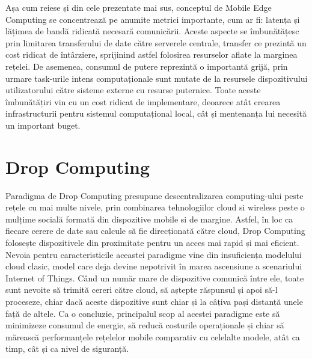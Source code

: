 \documentclass[12pt,a4paper]{report}
\begin{document}
Așa cum reiese și din cele prezentate mai sus, conceptul de Mobile Edge Computing se concentrează pe anumite metrici importante, cum ar fi: latența și lățimea de bandă ridicată necesară comunicării. Aceste aspecte se îmbunătățesc prin limitarea transferului de date către serverele centrale, transfer ce prezintă un cost ridicat de întârziere, sprijinind astfel folosirea resurselor aflate la marginea rețelei. De asemenea, consumul de putere reprezintă o importantă grijă, prin urmare task-urile intens computaționale sunt mutate de la resursele dispozitivului utilizatorului către sisteme externe cu resurse puternice. Toate aceste îmbunătățiri vin cu un cost ridicat de implementare, deoarece atât crearea infrastructurii pentru sistemul computațional local, cât și mentenanța lui necesită un important buget. 

\section{Drop Computing}
Paradigma de Drop Computing\cite{DC} presupune descentralizarea computing-ului peste rețele cu mai multe nivele, prin combinarea tehnologiilor cloud si wireless peste o mulțime socială formată din dispozitive mobile si de margine. Astfel, în loc ca fiecare cerere de date sau calcule să fie direcționată către cloud, Drop Computing folosește dispozitivele din proximitate pentru un acces mai rapid și mai eficient. Nevoia pentru caracteristicile aceastei paradigme vine din insuficiența modelului cloud clasic, model care deja devine nepotrivit în marea ascensiune a scenariului Internet of Things. Când un număr mare de dispozitive comunică între ele, toate sunt nevoite să trimită cereri către cloud, să aștepte răspunsul și apoi să-l proceseze, chiar dacă aceste dispozitive sunt chiar și la câțiva pași distanță unele față de altele.
Ca o concluzie, principalul scop al acestei paradigme este să minimizeze consumul de energie, să reducă costurile operaționale și chiar să mărească performanțele rețelelor mobile comparativ cu celelalte modele, atât ca timp, cât și ca nivel de siguranță.
	
\end{document}
